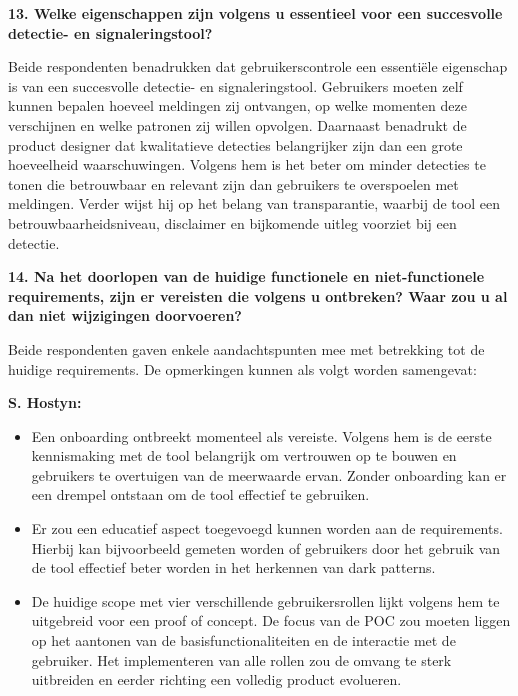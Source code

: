 \vspace{1em}

\textbf{13. Welke eigenschappen zijn volgens u essentieel voor een succesvolle detectie- en signaleringstool?}

Beide respondenten benadrukken dat gebruikerscontrole een essentiële eigenschap is van een succesvolle detectie- en signaleringstool. Gebruikers moeten zelf kunnen bepalen hoeveel meldingen zij ontvangen, op welke momenten deze verschijnen en welke patronen zij willen opvolgen. Daarnaast benadrukt de product designer dat kwalitatieve detecties belangrijker zijn dan een grote hoeveelheid waarschuwingen. Volgens hem is het beter om minder detecties te tonen die betrouwbaar en relevant zijn dan gebruikers te overspoelen met meldingen. Verder wijst hij op het belang van transparantie, waarbij de tool een betrouwbaarheidsniveau, disclaimer en bijkomende uitleg voorziet bij een detectie.

\vspace{1em}

\textbf{14. Na het doorlopen van de huidige functionele en niet-functionele requirements, zijn er vereisten die volgens u ontbreken? Waar zou u al dan niet wijzigingen doorvoeren?}

Beide respondenten gaven enkele aandachtspunten mee met betrekking tot de huidige requirements. De opmerkingen kunnen als volgt worden samengevat:

\vspace{1em}

\textbf{S. Hostyn:}
\begin{itemize}
    \item Een onboarding ontbreekt momenteel als vereiste. Volgens hem is de eerste kennismaking met de tool belangrijk om vertrouwen op te bouwen en gebruikers te overtuigen van de meerwaarde ervan. Zonder onboarding kan er een drempel ontstaan om de tool effectief te gebruiken.
    \item Er zou een educatief aspect toegevoegd kunnen worden aan de requirements. Hierbij kan bijvoorbeeld gemeten worden of gebruikers door het gebruik van de tool effectief beter worden in het herkennen van dark patterns.
    \item De huidige scope met vier verschillende gebruikersrollen lijkt volgens hem te uitgebreid voor een proof of concept. De focus van de POC zou moeten liggen op het aantonen van de basisfunctionaliteiten en de interactie met de gebruiker. Het implementeren van alle rollen zou de omvang te sterk uitbreiden en eerder richting een volledig product evolueren.
\end{itemize}
    
